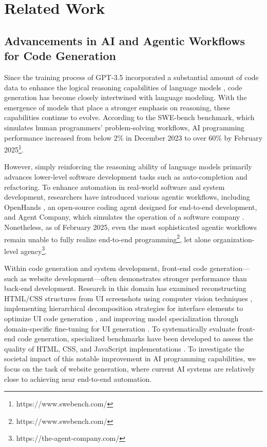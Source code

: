 \section{Related Work}

\subsection{Advancements in AI and Agentic Workflows for Code Generation}

Since the training process of GPT-3.5 incorporated a substantial amount of code data to enhance the logical reasoning capabilities of language models \cite{chenEvaluatingLargeLanguage2021}, code generation has become closely intertwined with language modeling. With the emergence of models that place a stronger emphasis on reasoning, these capabilities continue to evolve. According to the SWE-bench benchmark, which simulates human programmers' problem-solving workflows, AI programming performance increased from below 2\% in December 2023 \cite{jimenez2024swebench} to over 60\% by February 2025\footnote{https://www.swebench.com/}.

However, simply reinforcing the reasoning ability of language models primarily advances lower-level software development tasks such as auto-completion and refactoring. To enhance automation in real-world software and system development, researchers have introduced various agentic workflows, including OpenHands \cite{openhands}, an open-source coding agent designed for end-to-end development, and Agent Company, which simulates the operation of a software company \cite{xu2024theagentcompany}. Nonetheless, as of February 2025, even the most sophisticated agentic workflows remain unable to fully realize end-to-end programming\footnote{https://www.swebench.com/}, let alone organization-level agency\footnote{https://the-agent-company.com/}. 

Within code generation and system development, front-end code generation—such as website development—often demonstrates stronger performance than back-end development. Research in this domain has examined reconstructing HTML/CSS structures from UI screenshots using computer vision techniques \cite{soseliaLearningUItoCodeReverse2023}, implementing hierarchical decomposition strategies for interface elements to optimize UI code generation \cite{wanAutomaticallyGeneratingUI2024}, and improving model specialization through domain-specific fine-tuning for UI generation \cite{wuUICoderFinetuningLarge2024}. To systematically evaluate front-end code generation, specialized benchmarks have been developed to assess the quality of HTML, CSS, and JavaScript implementations \cite{siDesign2CodeHowFar2024}. To investigate the societal impact of this notable improvement in AI programming capabilities, we focus on the task of website generation, where current AI systems are relatively close to achieving near end-to-end automation.


